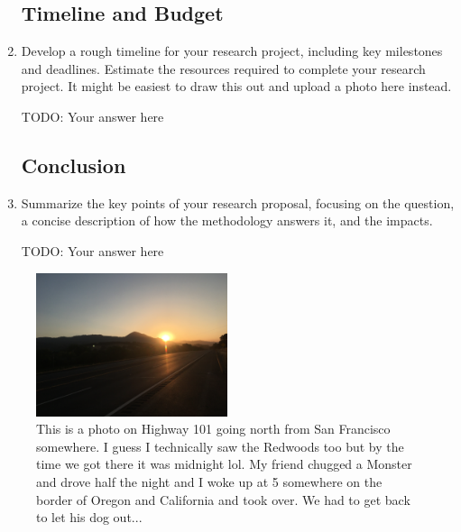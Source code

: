 \documentclass[letterpaper,11pt]{article}
\begin{document}
\begin{enumerate}
\subsection{Timeline and Budget}
\item
    Develop a rough timeline for your research project, including key milestones and deadlines.
    Estimate the resources required to complete your research project.
    It might be easiest to draw this out and upload a photo here instead.
\begin{tcolorbox}
TODO: Your answer here
\newline
\newline
\newline
\newline
\newline
\newline
\newline
\newline
\newline
\end{tcolorbox}

\subsection{Conclusion}
\item
    Summarize the key points of your research proposal, focusing on the question, a concise description of how the methodology answers it, and the impacts. \\
\begin{tcolorbox}
TODO: Your answer here
\newline
\newline
\newline
\newline
\newline
\newline
\newline
\newline
\newline
\end{tcolorbox}
\end{enumerate}

\begin{figure}[h]
\caption{This is a photo on Highway 101 going north from San Francisco somewhere. I guess I technically saw the Redwoods too but by the time we got there it was midnight lol. My friend chugged a Monster and drove half the night and I woke up at 5 somewhere on the border of Oregon and California and took over. We had to get back to let his dog out...}
\centering
\includegraphics[width=0.5\textwidth]{101.JPG}
\end{figure}
\end{document}
